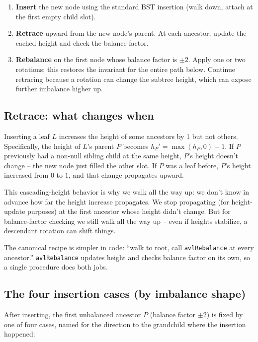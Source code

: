 \documentclass[11pt]{article}
\begin{document}
\begin{defnbox}
\begin{enumerate}[leftmargin=*]
    \item \textbf{Insert} the new node using the standard BST insertion (walk down, attach at the first empty child slot).
    \item \textbf{Retrace} upward from the new node's parent. At each ancestor, update the cached height and check the balance factor.
    \item \textbf{Rebalance} on the first node whose balance factor is $\pm 2$. Apply one or two rotations; this restores the invariant for the entire path below. Continue retracing because a rotation can change the subtree height, which can expose further imbalance higher up.
\end{enumerate}
\end{defnbox}

\subsection*{Retrace: what changes when}

Inserting a leaf $L$ increases the height of some ancestors by 1 but not others. Specifically, the height of $L$'s parent $P$ becomes $h_P' = \max(h_P, 0) + 1$. If $P$ previously had a non-null sibling child at the same height, $P$'s height doesn't change -- the new node just filled the other slot. If $P$ was a leaf before, $P$'s height increased from $0$ to $1$, and that change propagates upward.

This cascading-height behavior is why we walk all the way up: we don't know in advance how far the height increase propagates. We stop propagating (for height-update purposes) at the first ancestor whose height didn't change. But for balance-factor checking we still walk all the way up -- even if heights stabilize, a descendant rotation can shift things.

The canonical recipe is simpler in code: ``walk to root, call \texttt{avlRebalance} at every ancestor.'' \texttt{avlRebalance} updates height and checks balance factor on its own, so a single procedure does both jobs.

\subsection*{The four insertion cases (by imbalance shape)}

After inserting, the first unbalanced ancestor $P$ (balance factor $\pm 2$) is fixed by one of four cases, named for the direction to the grandchild where the insertion happened:
\end{document}
